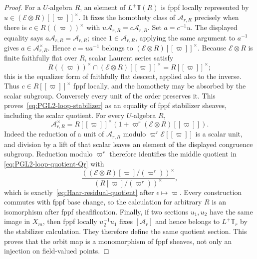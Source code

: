 \documentclass[11pt]{article}
\theoremstyle{definition}
\theoremstyle{remark}
\begin{document}
\begin{proof}
For a $U$-algebra $R$, an element of $L^+\mathbb T(R)$ is fppf locally
represented by $u\in(\mathcal E\otimes R)[[\varpi]]^\times$.  It fixes the
homothety class of $\mathcal A_{r,R}$ precisely when there is
$c\in R((\varpi))^\times$ with
$u\mathcal A_{r,R}=c\mathcal A_{r,R}$.  Set $a=c^{-1}u$.  The displayed equality says
$a\mathcal A_{r,R}=\mathcal A_{r,R}$; since $1\in\mathcal A_{r,R}$, applying
the same argument to $a^{-1}$ gives
$a\in\mathcal A_{r,R}^\times$.  Hence
$c=ua^{-1}$ belongs to
$(\mathcal E\otimes R)[[\varpi]]^\times$.  Because
$\mathcal E\otimes R$ is finite faithfully flat over $R$, scalar Laurent
series satisfy
\[
 R((\varpi))^\times\cap
 (\mathcal E\otimes R)[[\varpi]]^\times
 =R[[\varpi]]^\times;
\]
this is the equalizer form of faithfully flat descent, applied also to the
inverse.  Thus $c\in R[[\varpi]]^\times$ fppf locally, and the homothety may
be absorbed by the scalar subgroup.  Conversely every unit of the order
preserves it.  This proves~\eqref{eq:PGL2-loop-stabilizer} as an equality of
fppf stabilizer sheaves, including the scalar quotient.
For every $U$-algebra $R$,
\[
 \mathcal A_{r,R}^\times
 =R[[\varpi]]^\times
  (1+\varpi^r(\mathcal E\otimes R)[[\varpi]]).
\]
Indeed the reduction of a unit of $\mathcal A_{r,R}$ modulo
$\varpi^r\mathcal E[[\varpi]]$ is a scalar unit, and division by a lift of
that scalar leaves an element of the displayed congruence subgroup.
Reduction modulo $\varpi^r$ therefore identifies the middle quotient in
\eqref{eq:PGL2-loop-quotient-Qr} with
\[
 \frac{((\mathcal E\otimes R)[\varpi]/(\varpi^r))^\times}
      {(R[\varpi]/(\varpi^r))^\times},
\]
which is exactly~\eqref{eq:Haar-residual-quotient} after
$\epsilon\mapsto\varpi$.  Every construction commutes with fppf base change,
so the calculation for arbitrary $R$ is an isomorphism after fppf
sheafification.  Finally, if two sections $u_1,u_2$ have the same image in
$X_m$, then fppf locally
$u_2^{-1}u_1$ fixes $[\mathcal A_r]$ and hence belongs to
$L^+\mathbb T_r$ by the stabilizer calculation.  They therefore define the
same quotient section.  This proves that the orbit map is a monomorphism of
fppf sheaves, not only an injection on field-valued points.
\end{proof}
\end{document}
